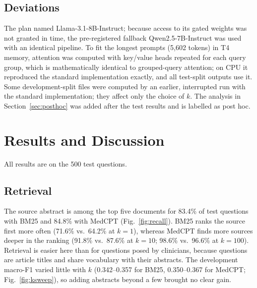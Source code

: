 \documentclass[conference]{IEEEtran}
\begin{document}
\subsection{Deviations}
The plan named Llama-3.1-8B-Instruct; because access to its gated weights was not
granted in time, the pre-registered fallback Qwen2.5-7B-Instruct was used with an
identical pipeline. To fit the longest prompts (5{,}602 tokens) in T4 memory,
attention was computed with key/value heads repeated for each query group, which
is mathematically identical to grouped-query attention; on CPU it reproduced the
standard implementation exactly, and all test-split outputs use it. Some
development-split files were computed by an earlier, interrupted run with the
standard implementation; they affect only the choice of $k$. The analysis in
Section~\ref{sec:posthoc} was added after the test results and is labelled as
post hoc.

\section{Results and Discussion}
All results are on the 500 test questions.

\subsection{Retrieval}
The source abstract is among the top five documents for 83.4\% of test questions
with BM25 and 84.8\% with MedCPT (Fig.~\ref{fig:recall}). BM25 ranks the source
first more often (71.6\% vs.\ 64.2\% at $k=1$), whereas MedCPT finds more sources
deeper in the ranking (91.8\% vs.\ 87.6\% at $k=10$; 98.6\% vs.\ 96.6\% at
$k=100$). Retrieval is easier here than for questions posed by clinicians,
because questions are article titles and share vocabulary with their abstracts.
The development macro-F1 varied little with $k$ (0.342--0.357 for BM25,
0.350--0.367 for MedCPT; Fig.~\ref{fig:ksweep}), so adding abstracts beyond a
few brought no clear gain.
\end{document}

